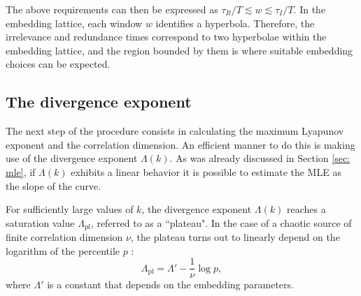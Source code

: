 The above requirements can then be expressed as $\tau_R/T \lesssim w \lesssim \tau_I/T$.
In the embedding lattice, each window $w$ identifies a hyperbola.
Therefore, the irrelevance and redundance times correspond to two hyperbolae
within the embedding lattice, and the region bounded by them is where suitable
embedding choices can be expected.


\subsection{The divergence exponent}
\label{subsec: divergence exponent}

The next step of the procedure consists in calculating the maximum Lyapunov exponent and
the correlation dimension. An efficient manner to do this is making use of the divergence exponent
$\Lambda(k)$. As was already discussed in Section \ref{sec: mle}, if $\Lambda(k)$ exhibits a
linear behavior it is possible to estimate the MLE as the slope of the curve.

For sufficiently large values of $k$, the divergence exponent $\Lambda(k)$
reaches a saturation value $\Lambda_{\text{pl}}$, referred to as a ``plateau".
In the case of a chaotic source of finite correlation dimension $\nu$, the plateau
turns out to linearly depend on the logarithm of the percentile $p$ \cite{ref:perinelli2020chasing}:
\begin{equation}
    \label{eq: Lambda plateau}
    \Lambda_{\text{pl}}=\Lambda'-\frac{1}{\nu}\log p,
\end{equation}
where $\Lambda'$ is a constant that depends on the embedding parameters.





\begin{comment}



\end{comment}